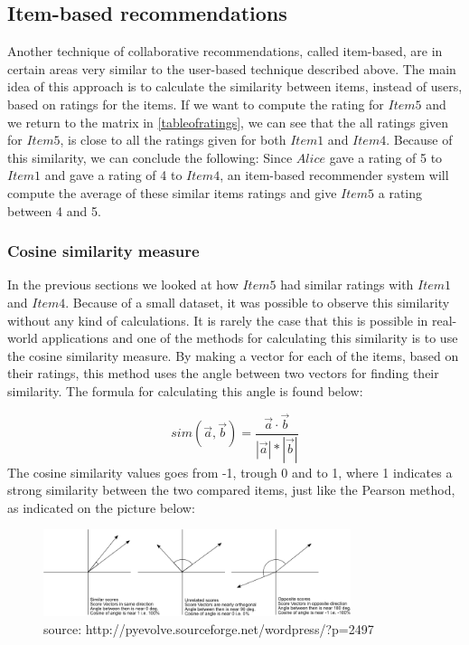 \subsection{Item-based recommendations} %
\label{sub:item_based_recommendations}
Another technique of collaborative recommendations, called item-based, are in certain areas very similar to the user-based technique described above. The main idea of this approach is to calculate the similarity between items, instead of users, based on ratings for the items. If we want to compute the rating for \(Item5\) and we return to the matrix in \ref{tableofratings}, we can see that the all ratings given for \(Item5\), is close to all the ratings given for both \(Item1\) and \(Item4\). Because of this similarity, we can conclude the following: Since \(Alice\) gave a rating of 5 to \(Item1\) and gave a rating of 4 to \(Item4\), an item-based recommender system will compute the average of these similar items ratings and give \(Item5\) a rating between 4 and 5.

\subsubsection{Cosine similarity measure}
In the previous sections we looked at how \(Item5\) had similar ratings with \(Item1\) and \(Item4\). Because of a small dataset, it was possible to observe this similarity without any kind of calculations. It is rarely the case that this is possible in real-world applications and one of the methods for calculating this similarity is to use the cosine similarity measure. \newline 
By making a vector for each of the items, based on their ratings, this method uses the angle between two vectors for finding their similarity. The formula for calculating this angle is found below:

\[
	sim(\vec{a}, \vec{b}) = \frac{\vec{a} \cdot \vec{b}}{|\vec{a}| * |\vec{b}| }
\]
\newline
The cosine similarity values goes from -1, trough 0 and to 1, where 1 indicates a strong similarity between the two compared items, just like the Pearson method, as indicated on the picture below:

\begin{figure}[H]
\centering
\includegraphics[width=90mm]{Pictures/cosinesimilarity.png}
\caption{source: http://pyevolve.sourceforge.net/wordpress/?p=2497}
\label{cosinesimilarity}
\end{figure}

